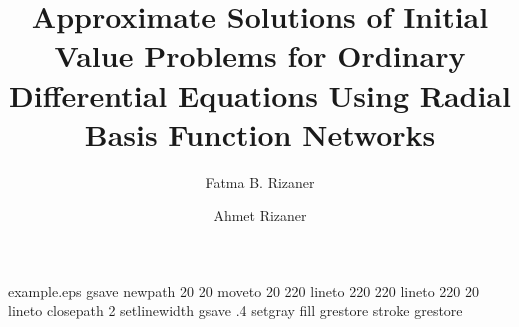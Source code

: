 %
%
%
%
%
\begin{filecontents*}{example.eps}
gsave
newpath
  20 20 moveto
  20 220 lineto
  220 220 lineto
  220 20 lineto
closepath
2 setlinewidth
gsave
  .4 setgray fill
grestore
stroke
grestore
\end{filecontents*}
%
\RequirePackage{fix-cm}
%
\documentclass[smallcondensed]{svjour3}     %
%
\smartqed  %
%
\usepackage{graphicx}
\usepackage{amsmath,amsthm}
%
%
%
%
%


\title{Approximate Solutions of Initial Value Problems for Ordinary Differential Equations Using Radial Basis Function Networks%
}


\author{Fatma B. Rizaner         \and
        Ahmet Rizaner %
}


